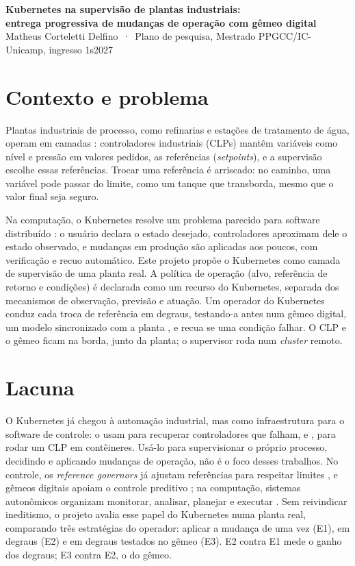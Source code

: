 \documentclass[11pt,a4paper]{article}
\begin{document}
\begin{center}
  {\large\bfseries Kubernetes na supervisão de plantas industriais:\\
  entrega progressiva de mudanças de operação com gêmeo digital}\\[4pt]
  Matheus Corteletti Delfino {\small\,·\, Plano de pesquisa, Mestrado PPGCC/IC-Unicamp, ingresso 1s2027}
\end{center}

\section{Contexto e problema}

Plantas industriais de processo, como refinarias e estações de tratamento de água, operam em camadas \cite{Skogestad2004}: controladores industriais (CLPs) mantêm variáveis como nível e pressão em valores pedidos, as referências (\textit{setpoints}), e a supervisão escolhe essas referências. Trocar uma referência é arriscado: no caminho, uma variável pode passar do limite, como um tanque que transborda, mesmo que o valor final seja seguro.

Na computação, o Kubernetes resolve um problema parecido para software distribuído \cite{Burns2016}: o usuário declara o estado desejado, controladores aproximam dele o estado observado, e mudanças em produção são aplicadas aos poucos, com verificação e recuo automático. Este projeto propõe o Kubernetes como camada de supervisão de uma planta real. A política de operação (alvo, referência de retorno e condições) é declarada como um recurso do Kubernetes, separada dos mecanismos de observação, previsão e atuação. Um operador do Kubernetes conduz cada troca de referência em degraus, testando-a antes num gêmeo digital, um modelo sincronizado com a planta \cite{Kritzinger2018}, e recua se uma condição falhar. O CLP e o gêmeo ficam na borda, junto da planta; o supervisor roda num \textit{cluster} remoto.

\section{Lacuna}

O Kubernetes já chegou à automação industrial, mas como infraestrutura para o software de controle:  o usam para recuperar controladores que falham, e , para rodar um CLP em contêineres. Usá-lo para supervisionar o próprio processo, decidindo e aplicando mudanças de operação, não é o foco desses trabalhos. No controle, os \textit{reference governors} já ajustam referências para respeitar limites \cite{Gilbert1995,Garone2017}, e gêmeos digitais apoiam o controle preditivo \cite{Zhao2023}; na computação, sistemas autonômicos organizam monitorar, analisar, planejar e executar \cite{Kephart2003}. Sem reivindicar ineditismo, o projeto avalia esse papel do Kubernetes numa planta real, comparando três estratégias do operador: aplicar a mudança de uma vez (E1), em degraus (E2) e em degraus testados no gêmeo (E3). E2 contra E1 mede o ganho dos degraus; E3 contra E2, o do gêmeo.
\end{document}
